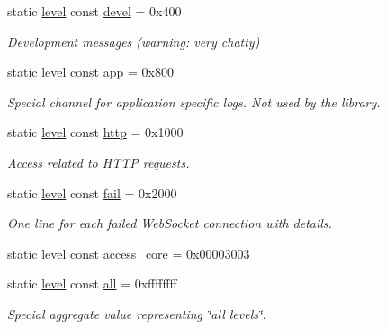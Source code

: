 \begin{DoxyCompactItemize}
static \hyperlink{namespacewebsocketpp_1_1log_a12d4d17939f102db8c9183d400a41960}{level} const \hyperlink{structwebsocketpp_1_1log_1_1alevel_a65ec21c75999c993c25c72569018f576}{devel} = 0x400
\begin{DoxyCompactList}\small\item\em Development messages (warning\+: very chatty) \end{DoxyCompactList}\item 
static \hyperlink{namespacewebsocketpp_1_1log_a12d4d17939f102db8c9183d400a41960}{level} const \hyperlink{structwebsocketpp_1_1log_1_1alevel_aaf67c94a68502c49308489ff01d8d0a8}{app} = 0x800
\begin{DoxyCompactList}\small\item\em Special channel for application specific logs. Not used by the library. \end{DoxyCompactList}\item 
static \hyperlink{namespacewebsocketpp_1_1log_a12d4d17939f102db8c9183d400a41960}{level} const \hyperlink{structwebsocketpp_1_1log_1_1alevel_af6e731e5771ab1a2267f79e5b9b8183a}{http} = 0x1000
\begin{DoxyCompactList}\small\item\em Access related to H\+T\+T\+P requests. \end{DoxyCompactList}\item 
static \hyperlink{namespacewebsocketpp_1_1log_a12d4d17939f102db8c9183d400a41960}{level} const \hyperlink{structwebsocketpp_1_1log_1_1alevel_a2e485329910f92f8f6356cf27bafd4a2}{fail} = 0x2000
\begin{DoxyCompactList}\small\item\em One line for each failed Web\+Socket connection with details. \end{DoxyCompactList}\item 
static \hyperlink{namespacewebsocketpp_1_1log_a12d4d17939f102db8c9183d400a41960}{level} const \hyperlink{structwebsocketpp_1_1log_1_1alevel_af5fdb4de43a77cacb4c3a5b01b816750}{access\+\_\+core} = 0x00003003
\item 
static \hyperlink{namespacewebsocketpp_1_1log_a12d4d17939f102db8c9183d400a41960}{level} const \hyperlink{structwebsocketpp_1_1log_1_1alevel_a853aa0b8976e53f3181af3bc398d493e}{all} = 0xffffffff
\begin{DoxyCompactList}\small\item\em Special aggregate value representing \char`\"{}all levels\char`\"{}. \end{DoxyCompactList}\end{DoxyCompactItemize}


